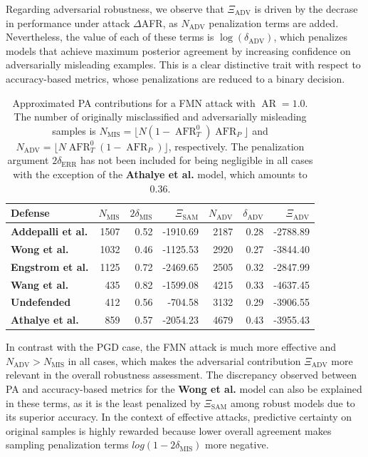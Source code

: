 Regarding adversarial robustness, we observe that $\Xi_{\text{ADV}}$ is driven by the decrase in 
performance under attack $\Delta$AFR, as $N_{\text{ADV}}$ penalization terms
are added. Nevertheless, the value of each of these terms is $\log(\delta_{\text{ADV}})$, which penalizes
models that achieve maximum posterior agreement by increasing confidence on adversarially
misleading examples. This is a clear distinctive trait with respect to accuracy-based metrics,
whose penalizations are reduced to a binary decision.


\begin{table}[H]
    \centering
    \begin{tabular}{l|rrr|rrr}
    Defense & $N_{\text{MIS}}$ & $2 \delta_{\text{MIS}}$ & $\Xi_{\text{SAM}}$ & $N_{\text{ADV}}$ & $\delta_{\text{ADV}}$ & $\Xi_{\text{ADV}}$ \\
    \midrule
    {\color{tab:purple} \textbf{Addepalli et al.}} & 1507 & 0.52 & -1910.69 & 2187 & 0.28 & -2788.89 \\
    {\color{tab:red} \textbf{Wong et al.}} & 1032 & 0.46 & -1125.53 & 2920 & 0.27 & -3844.40 \\
    {\color{tab:blue} \textbf{Engstrom et al.}} & 1125 & 0.72 & -2469.65 & 2505 & 0.32 & -2847.99 \\
    {\color{tab:brown} \textbf{Wang et al.}} & 435 & 0.82 & -1599.08 & 4215 & 0.33 & -4637.45 \\
    {\color{tab:orange} \textbf{Undefended}} & 412 & 0.56 & -704.58 & 3132 & 0.29 & -3906.55 \\
    {\color{tab:green} \textbf{Athalye et al.}} & 859 & 0.57 & -2054.23 & 4679 & 0.43 & -3955.43 \\
    \bottomrule
    \end{tabular}
    \caption{
    Approximated PA contributions for a FMN attack with $\operatorname{AR} = 1.0$. The number of 
    originally misclassified and adversarially misleading
    samples is $N_{\text{MIS}} = \lfloor N (1-\operatorname{AFR}_T^0) \operatorname{AFR}_P \rfloor$ and
    $N_{\text{ADV}} = \lfloor N \operatorname{AFR}_T^0 (1-\operatorname{AFR}_P) \rfloor$, respectively. 
    The penalization argument $2 \delta_{\text{ERR}}$ has not
    been included for being negligible in all cases with the exception of the 
    {\color{tab:green} \textbf{Athalye et al.}} model, which amounts to 0.36. 
    }
    \label{tab:approx_pa_fmn_table}
    \end{table}

In contrast with the PGD case, the FMN attack is much more effective and $N_{\text{ADV}} > N_{\text{MIS}}$
in all cases, which makes the adversarial contribution $\Xi_{\text{ADV}}$ more relevant in the
overall robustness assessment. The discrepancy observed between PA and
accuracy-based metrics for the {\color{tab:red} \textbf{Wong et al.}} model can also be explained 
in these terms, as it is the least penalized by $\Xi_{\text{SAM}}$ among robust models due to its
superior accuracy. In the context of effective attacks, predictive certainty on
original samples is highly rewarded because lower overall agreement makes sampling penalization terms
$log(1 - 2 \delta_{\text{MIS}})$ more negative. \\


